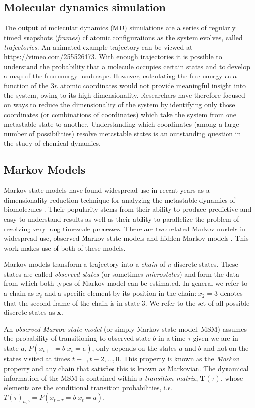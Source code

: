 \documentclass[a4paper,10pt,oneside]{article}
\begin{document}
\begin{sloppy}
\subsection{Molecular dynamics simulation} \label{ssec:compSim}
The output of molecular dynamics (MD) simulations are a series of regularly timed snapshots (\emph{frames}) of atomic configurations as the system evolves, called \emph{trajectories}. An animated example trajectory can be viewed at \url{https://vimeo.com/255526473}.  With enough trajectories it is possible to understand the probability that a molecule occupies certain states and to develop a  map of the free energy landscape. However, calculating the free energy as a function of the $3n$ atomic coordinates would not provide meaningful insight into the system, owing to its high dimensionality. Researchers have therefore focused on ways to reduce the dimensionality of the system by identifying only those coordinates (or combinations of coordinates) which take the system from one metastable state to another.  Understanding which coordinates (among a large number of possibilities) resolve metastable states is an outstanding question in the study of chemical dynamics. 

\subsection{Markov Models}
Markov state models have found widespread use in recent years as a dimensionality reduction technique for analyzing the metastable dynamics of biomolecules \cite{CHODERA2014135}.  Their popularity stems from their ability to produce predictive and easy to understand results as well as their ability to parallelize the problem of resolving very long timescale processes.  There are two related Markov models in widespread use, observed Markov state models \cite{prinz2011markov} and hidden Markov models \cite{noe2013projected}. This work makes use of both of these models. 

Markov models transform a trajectory into a \emph{chain} of $n$ discrete states.  These states are called \emph{observed states} (or sometimes \emph{microstates}) and form the data from which both types of Markov model can be estimated. In general we refer to a chain as $x_{t}$ and a specific element by its position in the chain: $x_2 = 3$ denotes that the second frame of the chain is in state $3$.  We refer to the set of all possible discrete states as $\mathbf{x}$. 

An \emph{observed Markov state model} (or simply Markov state model, MSM) assumes  the probability of transitioning to observed state $b$ in a time $\tau$ given we are in state $a$,  $P(x_{t+\tau}=b|x_{t}=a)$, only depends on the states $a$ and $b$ and not on the states visited at times  $t-1, t-2,...,0$. This property is known as the \emph{Markov} property and any chain that satisfies this is known as Markovian. The dynamical information of the MSM is contained within a \emph{transition matrix}, $\mathbf{T}(\tau)$, whose elements are the conditional transition probabilities, i.e.\ $T(\tau)_{a,b} = P(x_{t+\tau}=b|x_{t}=a)$.  


\end{sloppy}
\end{document}
